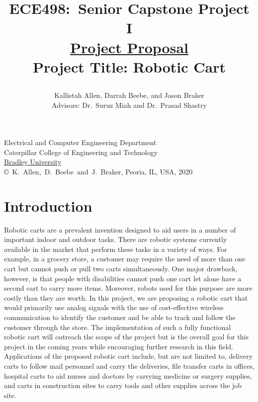 \documentclass[letterpaper,12pt]{article}   %
\title{ECE498:~Senior Capstone Project I\\\textbf{\underline{Project Proposal}}\\
\vspace{0.5in}
Project Title: Robotic Cart
\vspace{1.0in}
\author{Kallistah Allen, Darrah Beebe, and Jason Braker\\ Advisors: Dr.~Suruz Miah and Dr.~Prasad Shastry}
}
\date{}  %
\begin{document}
\begin{titlepage}
 \maketitle

\vspace*{4.0cm}
\begin{center}
\normalsize
Electrical and Computer Engineering Department\\
Caterpillar College of Engineering and Technology\\
\href{http://www.bradley.edu/}{Bradley University}\\

\vspace*{6.0cm}
\copyright~K.~Allen,~D.~Beebe~and~J.~Braker, Peoria, IL, USA, 2020\\

\end{center}
\thispagestyle{empty}

\end{titlepage} 
\newpage
\renewcommand{\contentsname}{Table of Contents}
\tableofcontents
\newpage

\section{Introduction}
Robotic carts are a prevalent invention designed to aid users in a number of important indoor and outdoor tasks. There are robotic systems currently available in the market that perform these tasks in a variety of ways. For example, in a grocery store, a customer may require the need of more than one cart but cannot push or pull two carts simultaneously. One major drawback, however, is that people with disabilities cannot push one cart let alone have a second cart to carry more items. Moreover, robots used for this purpose are more costly than they are worth. In this project, we are proposing a robotic cart that would primarily use analog signals with the use of cost-effective wireless communication to identify the customer and be able to track and follow the customer through the store. The implementation of such a fully functional robotic cart will outreach the scope of the project but is the overall goal for this project in the coming years while encouraging further research in this field. Applications of the proposed robotic cart include, but are not limited to, delivery carts to follow mail personnel and carry the deliveries, file transfer carts in offices, hospital carts to aid nurses and doctors by carrying medicine or surgery supplies, and carts in construction sites to carry tools and other supplies across the job site.
\end{document}
